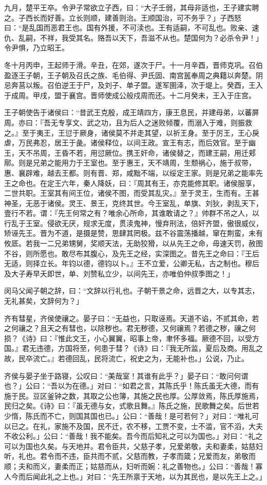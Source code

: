 \documentclass[]{article}
\begin{document}
九月，楚平王卒。令尹子常欲立子西，曰：``大子壬弱，其母非适也，王子建实聘之。子西长而好善。立长则顺，建善则治。王顺国治，可不务乎？」子西怒曰：``是乱国而恶君王也。国有外援，不可渎也。王有适嗣，不可乱也。败亲、速仇、乱嗣，不祥，我受其名。赂吾以天下，吾滋不从也。楚国何为？必杀令尹！」令尹惧，乃立昭王。

冬十月丙申，王起师于滑。辛丑，在郊，遂次于尸。十一月辛酉，晋师克巩。召伯盈逐王子朝，王子朝及召氏之族、毛伯得、尹氏固、南宫嚚奉周之典籍以奔楚。阴忌奔莒以叛。召伯逆王于尸，及刘子、单子盟。遂军圉泽，次于堤上。癸酉，王入于成周。甲戌，盟于襄宫。晋师使成公般戍周而还。十二月癸未，王入于庄宫。

王子朝使告于诸侯曰：``昔武王克殷，成王靖四方，康王息民，并建母弟，以蕃屏周。亦曰：『吾无专享文、武之功，且为后人之迷败倾覆，而溺入于难，则振救之。』至于夷王，王愆于厥身，诸侯莫不并走其望，以祈王身。至于厉王，王心戾虐，万民弗忍，居王于彘。诸侯释位，以间王政。宣王有志，而后效官。至于幽王，天不吊周，王昏不若，用愆厥位。携王奸命，诸侯替之，而建王嗣，用迁郏鄏。则是兄弟之能用力于王室也。至于惠王，天不靖周，生颓祸心，施于叔带，惠、襄辟难，越去王都。则有晋、郑，咸黜不端，以绥定王家。则是兄弟之能率先王之命也。在定王六年，秦人降妖，曰：『周其有王，亦克能修其职。诸侯服享，二世共职。王室其有间王位，诸侯不图，而受其乱灾。』至于灵王，生而有。王甚神圣，无恶于诸侯。灵王、景王，克终其世。今王室乱，单旗、刘狄，剥乱天下，壹行不若。谓：『先王何常之有？唯余心所命，其谁敢请之？』帅群不吊之人，以行乱于王室。侵欲无厌，规求无度，贯渎鬼神，慢弃刑法，倍奸齐盟，傲很威仪，矫诬先王。晋为不道，是摄是赞，思肆其罔极。兹不谷震荡播越，窜在荆蛮，未有攸厎。若我一二兄弟甥舅，奖顺天法，无助狡猾，以从先王之命，毋速天罚，赦图不谷，则所愿也。敢尽布其腹心，及先王之经，实深图之。昔先王之命曰：『王后无适，则择立长。年钧以德，德钧以卜。』王不立爱，公卿无私，古之制也。穆后及大子寿早夭即世，单、刘赞私立少，以间先王，亦唯伯仲叔季图之！」

闵马父闻子朝之辞，曰：``文辞以行礼也。子朝干景之命，远晋之大，以专其志，无礼甚矣，文辞何为？」

齐有彗星，齐侯使禳之。晏子曰：``无益也，只取诬焉。天道不谄，不贰其命，若之何禳之？且天之有彗也，以除秽也。君无秽德，又何禳焉？若德之秽，禳之何损？《诗》曰：『惟此文王，小心翼翼，昭事上帝，聿怀多福。厥德不回，以受方国。』君无违德，方国将至，何患于彗？《诗》曰：『我无所监，夏后及商。用乱之故，民卒流亡。』若德回乱，民将流亡，祝史之为，无能补也。」公说，乃止。

齐侯与晏子坐于路寝，公叹曰：``美哉室！其谁有此乎？」晏子曰：``敢问何谓也？」公曰：``吾以为在德。」对曰：``如君之言，其陈氏乎！陈氏虽无大德，而有施于民。豆区釜钟之数，其取之公也簿，其施之民也厚。公厚敛焉，陈氏厚施焉，民归之矣。《诗》曰：『虽无德与女，式歌且舞。』陈氏之施，民歌舞之矣。后世若少惰，陈氏而不亡，则国其国也已。」公曰：``善哉！是可若何？」对曰：``唯礼可以已之。在礼，家施不及国，民不迁，农不移，工贾不变，士不滥，官不滔，大夫不收公利。」公曰：``善哉！我不能矣。吾今而后知礼之可以为国也。」对曰：``礼之可以为国也久矣。与天地并。君令臣共，父慈子孝，兄爱弟敬，夫和妻柔，姑慈妇听，礼也。君令而不违，臣共而不贰，父慈而教，子孝而箴；兄爱而友，弟敬而顺；夫和而义，妻柔而正；姑慈而从，妇听而婉：礼之善物也。」公曰：``善哉！寡人今而后闻此礼之上也。」对曰：``先王所禀于天地，以为其民也，是以先王上之。」
\end{document}
